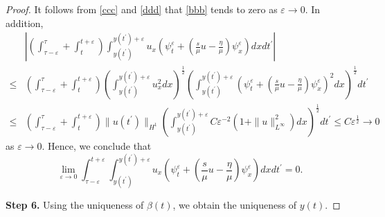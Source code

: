 \documentclass[10pt]{article}
\numberwithin{equation}{section}
\begin{document}
\begin{proof}
		It follows from \eqref{ccc} and \eqref{ddd} that \eqref{bbb} tends to zero as $\varepsilon\to 0$. In addition, 
		\begin{align*}
			& \left|\left(\int_{\tau-\varepsilon}^{\tau}+\int_{t}^{t+\varepsilon}\right)\int_{y(t^\prime)}^{y(t^\prime)+\varepsilon}u_{x}\left(\psi_{t}^{\varepsilon}+\left(\frac{s}{\mu}u-\frac{\eta}{\mu}\right)\psi_{x}^{\varepsilon}\right)dxdt^\prime\right| \\
			\leq&\left(\int_{\tau-\varepsilon}^{\tau}+\int_{t}^{t+\varepsilon}\right)\left(\int_{y(t^\prime)}^{y(t^\prime)+\varepsilon}u_{x}^{2}dx\right)^{\frac{1}{2}}\left(\int_{y(t^\prime)}^{y(t^\prime)+\varepsilon}\left(\psi_{t}^{\varepsilon}+\left(\frac{s}{\mu}u-\frac{\eta}{\mu}\right)\psi_{x}^{\varepsilon}\right)^{2}dx\right)^{\frac{1}{2}}dt^\prime \\
			\leq&\left(\int_{\tau-\varepsilon}^{\tau}+\int_{t}^{t+\varepsilon}\right)\|u(t^\prime)\|_{H^{1}}\left(\int_{y(t^\prime)}^{y(t^\prime)+\varepsilon}C\varepsilon^{-2}\left(1+\|u\|_{L^{\infty}}^{2}\right)dx\right)^{\frac{1}{2}}dt^\prime\leq C\varepsilon^{\frac{1}{2}}\to0
		\end{align*}
		as $\varepsilon\to0$. Hence, we conclude that
		$$\lim_{\varepsilon\to0}\int_{\tau-\varepsilon}^{t+\varepsilon}\int_{y(t^\prime)}^{y(t^\prime)+\varepsilon}u_{x}\left(\psi_{t}^{\varepsilon}+\left(\frac{s}{\mu}u-\frac{\eta}{\mu}\right)\psi_{x}^{\varepsilon}\right)dxdt^\prime=0.$$
		
		\textbf{Step 6.} Using the uniqueness of $\beta(t)$, we obtain the uniqueness of $y(t)$.
	\end{proof}
	
\end{document}
